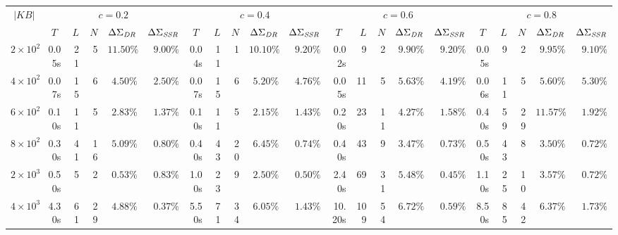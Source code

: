 \documentclass[letterpaper]{article} %
\begin{document}
\begin{table}
\renewcommand{\arraystretch}{1.0}
  \setlength{\tabcolsep}{3pt}
   \centering
 \resizebox{1.7\columnwidth}{!} {%
  \begin{tabular}{|c||rrrrr|rrrrr|rrrrr|rrrrr|}
  \hline
   \multirow{2}{*}{$|KB|$} & \multicolumn{5}{c|}{$c = 0.2$} & \multicolumn{5}{c|}{$c=0.4$} & \multicolumn{5}{c|}{$c=0.6$} & \multicolumn{5}{c|}{$c=0.8$} \\
    \multicolumn{1}{|c||}{} & \multicolumn{1}{c}{$T$} & $L$ & $N$ & \multicolumn{1}{c}{$\Delta \Sigma_{\text{\emph{DR}}}$} & \multicolumn{1}{c|}{$\Delta \Sigma_{\text{\emph{SSR}}}$} & \multicolumn{1}{c}{$T$} & $L$ & $N$ & \multicolumn{1}{c}{$\Delta \Sigma_{\text{\emph{DR}}}$} & \multicolumn{1}{c|}{$\Delta \Sigma_{\text{\emph{SSR}}}$} & \multicolumn{1}{c}{$T$} & $L$ & $N$ & \multicolumn{1}{c}{$\Delta \Sigma_{\text{\emph{DR}}}$} & \multicolumn{1}{c|}{$\Delta \Sigma_{\text{\emph{SSR}}}$} & \multicolumn{1}{c}{$T$} & $L$ & $N$ & \multicolumn{1}{c}{$\Delta \Sigma_{\text{\emph{DR}}}$} & \multicolumn{1}{c|}{$\Delta \Sigma_{\text{\emph{SSR}}}$}  \\
  \hline
  \hline
  $2 \times 10^2$ & 0.05s & 21 & 5 & $11.50\%$ &$9.00\%$ & 0.04s & 11 & 1 &  $10.10\%$ &$9.20\%$ & 0.02s & 9 & 2 & $9.90\%$ &$9.20\%$ & 0.05s & 9 & 2 & $9.95\%$ &$9.10\%$  \\
  
  $4 \times 10^2$ & 0.07s & 15 & 6 & $4.50\%$ &$2.50\%$ &0.07s & 15 & 6 & $5.20\%$ &$4.76\%$ & 0.05s & 11 & 5 & $5.63\%$ &$4.19\%$ & 0.06s & 11 & 5 & $5.60\%$ &$5.30\%$ \\
  
  $6 \times 10^2$ & 0.10s & 11 & 5 & $2.83\%$ &$1.37\%$ & 0.10s & 11& 5& $2.15\%$ &$1.43\%$ & 0.20s & 23  & 11 & $4.27\%$ &$1.58\%$ & 0.40s & 59 & 29 & $11.57\%$ &$1.92\%$  \\
  
  $8 \times 10^2$ & 0.30s & 41& 16 & $5.09\%$ &$0.80\%$ & 0.40s & 43 & 20 & $6.45\%$ &$0.74\%$ & 0.40s & 43 & 9 & $3.47\%$ &$0.73\%$ & 0.50s & 43 & 8 & $3.50\%$ &$0.72\%$ \\
\hline 
\hline
$2 \times 10^3$ &  0.50s & 5 & 2 & $0.53\%$ &$0.83\%$ & 1.00s & 23 & 9 & $2.50\%$ &$0.50\%$ & 2.40s&  69& 31 & $5.48\%$ &$0.45\%$ & 1.10s & 25 & 10 & $3.57\%$ &$0.72\%$  \\
  
  $4 \times 10^3$ & 4.30s & 61 & 29 & $4.88\%$ &$0.37\%$ & 5.50s & 71 & 34 & $6.05\%$ &$1.43\%$ & 10.20s & 109 & 54 & $6.72\%$ &$0.59\%$ & 8.50s & 85 & 42 &$6.37\%$ &$1.73\%$     \\
  

\end{tabular}}
\end{table}
\end{document}
